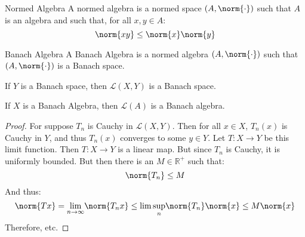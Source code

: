 \documentclass[crop=false,class=article,oneside]{standalone}
\begin{document}
        \begin{ldefinition}{Normed Algebra}
            A normed algebra is a normed space $(A,\norm{\cdot})$
            such that $A$ is an algebra and such that,
            for all $x,y\in{A}$:
            \begin{equation}
                \norm{xy}\leq\norm{x}\norm{y}
            \end{equation}
        \end{ldefinition}
        \begin{ldefinition}{Banach Algebra}
            A Banach Algebra is a normed algebra $(A,\norm{\cdot})$
            such that $(A,\norm{\cdot})$ is a Banach space.
        \end{ldefinition}
        \begin{theorem}
            If $Y$ is a Banach space, then $\mathscr{L}(X,Y)$
            is a Banach space.
        \end{theorem}
        \begin{theorem}
            If $X$ is a Banach Algebra, then
            $\mathscr{L}(A)$ is a Banach algebra.
        \end{theorem}
        \begin{proof}
            For suppose $T_{n}$ is Cauchy in
            $\mathscr{L}(X,Y)$. Then for all $x\in{X}$,
            $T_{n}(x)$ is Cauchy in $Y$, and thus
            $T_{n}(x)$ converges to some $y\in{Y}$. Let
            $T:X\rightarrow{Y}$ be this limit function. Then
            $T:X\rightarrow{Y}$ is a linear map. But since
            $T_{n}$ is Cauchy, it is uniformly bounded. But then
            there is an $M\in\mathbb{R}^{+}$ such that:
            \begin{equation}
                \norm{T_{n}}\leq{M}
            \end{equation}
            And thus:
            \begin{equation}
                \norm{T{x}}=
                \underset{n\rightarrow\infty}{\lim}
                \norm{T_{n}x}\leq
                \lim\underset{n}{\sup}\norm{T_{n}}\norm{x}
                \leq{M}\norm{x}
            \end{equation}
            Therefore, etc.
        \end{proof}
\end{document}
